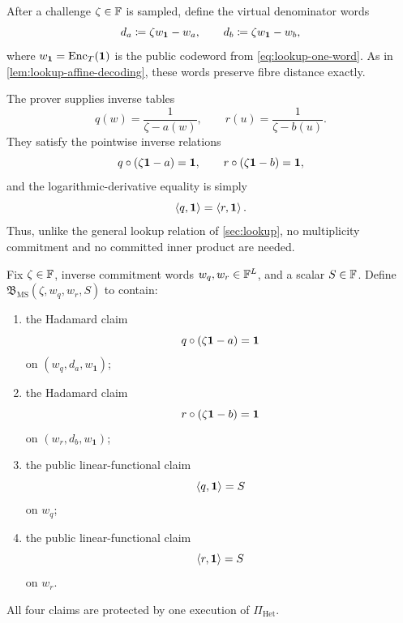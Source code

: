 After a challenge $\zeta\in\mathbb{F}$ is sampled, define the virtual denominator words
\begin{equation}
  d_a\coloneqq\zeta w_{\mathbf1}-w_a,
  \qquad
  d_b\coloneqq\zeta w_{\mathbf1}-w_b,
  \label{eq:multiset-denominator-words}
\end{equation}
where $w_{\mathbf1}=\operatorname{Enc}_T(\mathbf1)$ is the public codeword from \eqref{eq:lookup-one-word}.  As in \cref{lem:lookup-affine-decoding}, these words preserve fibre distance exactly.

The prover supplies inverse tables
\begin{equation}
  q(w)=\frac1{\zeta-a(w)},
  \qquad
  r(u)=\frac1{\zeta-b(u)}.
  \label{eq:multiset-inverse-tables}
\end{equation}
They satisfy the pointwise inverse relations
\begin{equation}
  q\circ(\zeta\mathbf1-a)=\mathbf1,
  \qquad
  r\circ(\zeta\mathbf1-b)=\mathbf1,
  \label{eq:multiset-inverse-hadamards}
\end{equation}
and the logarithmic-derivative equality is simply
\begin{equation}
  \left\langle q,\mathbf1\right\rangle=\left\langle r,\mathbf1\right\rangle.
  \label{eq:multiset-sum-equality}
\end{equation}
Thus, unlike the general lookup relation of \cref{sec:lookup}, no multiplicity commitment and no committed inner product are needed.

\begin{definition}
\label{def:multiset-sub-batch}
Fix $\zeta\in\mathbb{F}$, inverse commitment words $w_q,w_r\in\mathbb{F}^L$, and a scalar $S\in\mathbb{F}$.  Define $\mathfrak B_{\mathrm{MS}}(\zeta,w_q,w_r,S)$ to contain:
\begin{enumerate}[label=(\roman*),leftmargin=*]
  \item the Hadamard claim
  \[
    q\circ(\zeta\mathbf1-a)=\mathbf1
  \]
  on $(w_q,d_a,w_{\mathbf1})$;
  \item the Hadamard claim
  \[
    r\circ(\zeta\mathbf1-b)=\mathbf1
  \]
  on $(w_r,d_b,w_{\mathbf1})$;
  \item the public linear-functional claim
  \[
    \left\langle q,\mathbf1\right\rangle=S
  \]
  on $w_q$;
  \item the public linear-functional claim
  \[
    \left\langle r,\mathbf1\right\rangle=S
  \]
  on $w_r$.
\end{enumerate}
All four claims are protected by one execution of $\Pi_{\mathrm{Het}}$.
\end{definition}

